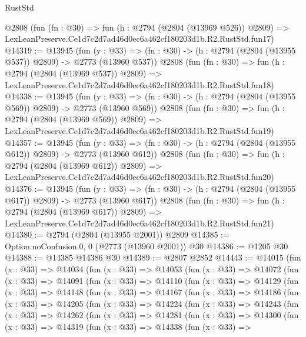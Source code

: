 \begin{lexlean}{RustStd}
\begin{coremodule}
    @2808
    (fun (fn : @30) =>
    fun (h : @2794 (@2804 (@13969 @526)) @2809) =>
    LexLeanPreserve.Ce1d7c2d7ad46d0ec6a462cf180203d1b.R2.RustStd.fun17)
@14319 := @13945
    (fun (y : @33) => (fn : @30) -> (h : @2794 (@2804 (@13955 @537)) @2809) -> @2773 (@13960 @537))
    @2808
    (fun (fn : @30) =>
    fun (h : @2794 (@2804 (@13969 @537)) @2809) =>
    LexLeanPreserve.Ce1d7c2d7ad46d0ec6a462cf180203d1b.R2.RustStd.fun18)
@14338 := @13945
    (fun (y : @33) => (fn : @30) -> (h : @2794 (@2804 (@13955 @569)) @2809) -> @2773 (@13960 @569))
    @2808
    (fun (fn : @30) =>
    fun (h : @2794 (@2804 (@13969 @569)) @2809) =>
    LexLeanPreserve.Ce1d7c2d7ad46d0ec6a462cf180203d1b.R2.RustStd.fun19)
@14357 := @13945
    (fun (y : @33) => (fn : @30) -> (h : @2794 (@2804 (@13955 @612)) @2809) -> @2773 (@13960 @612))
    @2808
    (fun (fn : @30) =>
    fun (h : @2794 (@2804 (@13969 @612)) @2809) =>
    LexLeanPreserve.Ce1d7c2d7ad46d0ec6a462cf180203d1b.R2.RustStd.fun20)
@14376 := @13945
    (fun (y : @33) => (fn : @30) -> (h : @2794 (@2804 (@13955 @617)) @2809) -> @2773 (@13960 @617))
    @2808
    (fun (fn : @30) =>
    fun (h : @2794 (@2804 (@13969 @617)) @2809) =>
    LexLeanPreserve.Ce1d7c2d7ad46d0ec6a462cf180203d1b.R2.RustStd.fun21)
@14380 := @2794 (@2804 (@13955 @2001)) @2809
@14385 := Option.noConfusion.{0, 0} (@2773 (@13960 @2001)) @30
@14386 := @1205 @30
@14388 := @14385 @14386 @30
@14389 := @2807 @2852
@14443 := @14015
    (fun (x : @33) =>
    @14034
      (fun (x : @33) =>
      @14053
        (fun (x : @33) =>
        @14072
          (fun (x : @33) =>
          @14091
            (fun (x : @33) =>
            @14110
              (fun (x : @33) =>
              @14129
                (fun (x : @33) =>
                @14148
                  (fun (x : @33) =>
                  @14167
                    (fun (x : @33) =>
                    @14186
                      (fun (x : @33) =>
                      @14205
                        (fun (x : @33) =>
                        @14224
                          (fun (x : @33) =>
                          @14243
                            (fun (x : @33) =>
                            @14262
                              (fun (x : @33) =>
                              @14281
                                (fun (x : @33) =>
                                @14300
                                  (fun (x : @33) =>
                                  @14319
                                    (fun (x : @33) =>
                                    @14338
                                      (fun (x : @33) =>

\end{coremodule}
\end{lexlean}
